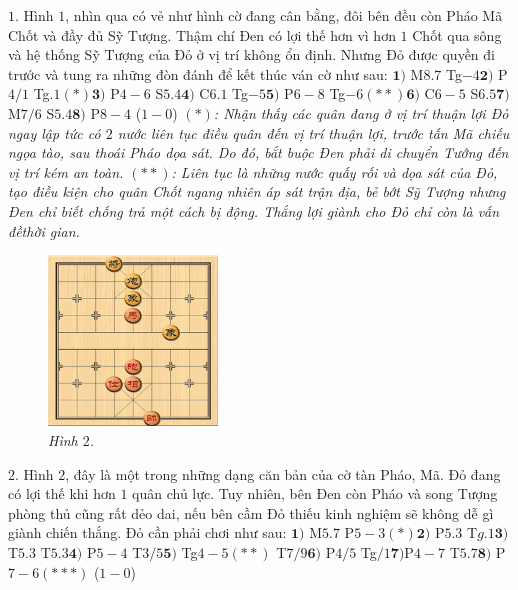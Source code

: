 \begin{multicols}{2}
	$1.$ Hình $1$, nhìn qua có vẻ như hình cờ đang cân bằng, đôi bên đều còn Pháo Mã Chốt và đầy đủ Sỹ Tượng. Thậm chí Đen có lợi thế hơn vì hơn $1$ Chốt qua sông và hệ thống Sỹ Tượng của Đỏ ở vị trí không ổn định. Nhưng Đỏ được quyền đi trước và tung ra những đòn đánh để kết thúc ván cờ như sau:
	\vskip 0.1cm
	$\pmb{1)}$ M$8.7$ Tg$-4$\quad $\pmb{2)}$ P$4/1$ Tg$.1$$(*)$\quad $\pmb{3)}$ P$4-6$ S$5.4$\quad $\pmb{4)}$ C$6.1$ Tg$-5$\quad $\pmb{5)}$ P$6-8$ Tg$-6$$(**)$\quad $\pmb{6)}$ C$6-5$ S$6.5$\quad $\pmb{7)}$ M$7/6$ S$5.4$\quad $\pmb{8)}$ P$8-4$ ($1-0$)
	\vskip 0.1cm
	\textit{$(*)$: Nhận thấy các quân đang ở vị trí thuận lợi Đỏ ngay lập tức có $2$ nước liên tục điều quân đến vị trí thuận lợi, trước tấn Mã chiếu ngọa tào, sau thoái Pháo dọa sát. Do đó, bắt buộc Đen phải di chuyển  Tướng đến vị trí kém an toàn.
	\vskip 0.1cm
	$(**)$: Liên tục là những nước quấy rối và dọa sát của Đỏ, tạo điều kiện cho quân Chốt ngang nhiên áp sát trận địa, bẻ bớt Sỹ Tượng nhưng Đen chỉ biết chống trả một cách bị động. Thắng lợi giành cho Đỏ chỉ còn là vấn đề\linebreak thời gian.}
	\begin{figure}[H]
		\centering
		\vspace*{-5pt}
		\captionsetup{labelformat= empty, justification=centering}
		\includegraphics[width=0.4\textwidth]{2}
		\caption{\small\textit{\color{gocco}Hình $2$.}}
		\vspace*{-10pt}
	\end{figure}
	$2$. Hình $2$, đây là một trong những dạng căn bản của cờ tàn Pháo, Mã. Đỏ đang có lợi thế khi hơn $1$ quân chủ lực. Tuy nhiên, bên Đen còn Pháo và song Tượng phòng thủ cũng rất dẻo dai, nếu bên cầm Đỏ thiếu kinh nghiệm sẽ không dễ gì giành chiến thắng. Đỏ cần phải chơi như sau:
	\vskip 0.1cm 
	$\pmb{1)}$	M$5.7$ P$5-3$$(*)$\quad $\pmb{2)}$ P$5.3$ T$g.1$\quad $\pmb{3)}$ T$5.3$ T$5.3$\quad  $\pmb{4)}$ P$5-4$ T$3/5$\quad $\pmb{5)}$ Tg$4-5$$(**)$ T$7/9$\quad $\pmb{6)}$ P$4/5$ Tg$/1$\quad $\pmb{7)}$P$4-7$ T$5.7$\quad $\pmb{8)}$ P$7-6$$(***)$ ($1-0$)
$$
\end{multicols}
